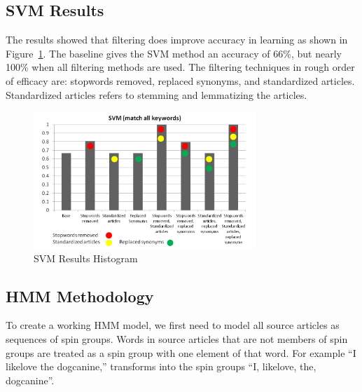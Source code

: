 \documentclass[11pt,letterpaper,oneside, titlepage]{scrartcl}
\begin{document}
\subsection{SVM Results}


The results showed that filtering does improve accuracy in learning as shown in Figure~\ref{fig:svm}. The baseline gives the SVM method an accuracy of 66\%, but nearly 100\% when all filtering methods are used. The filtering techniques in rough order of efficacy are: stopwords removed, replaced synonyms, and standardized articles. Standardized articles refers to stemming and lemmatizing the articles.


\begin{figure}[h!]
  \centering
  \includegraphics[width=0.75\textwidth]{svm_allmatches}
  \caption{SVM Results Histogram}
  \label{fig:svm}
\end{figure}

\subsection{HMM Methodology}

To create a working HMM model, we first need to model all source articles as sequences of spin groups. Words in source articles that are not members of spin groups are treated as a spin group with one element of that word. For example “I {like\textbar love} the {dog\textbar canine},” transforms into the spin groups “{I}, {like\textbar love}, {the}, {dog\textbar canine}”.
\end{document}
